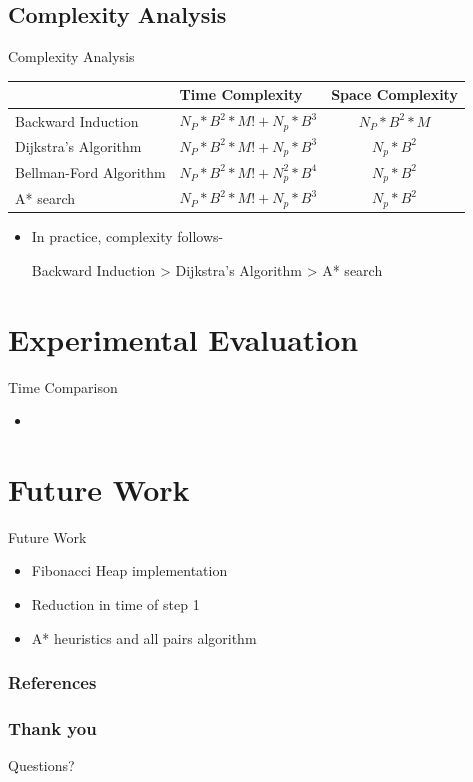 \documentclass{beamer}
\makeatletter
\newcounter{multipleslide}
\newcommand{\multipleframe}
{
	\setcounter{multipleslide}{\value{framenumber}}
	\stepcounter{multipleslide}
	\patchcmd{\beamer@@tmpl@footline}
	{\insertframenumber}
	{\themultipleslide}
	{}
	{}
}
\newcommand{\restoreframe}
{
	\patchcmd{\beamer@@tmpl@footline}
	{\themultipleslide}
  	{\insertframenumber}
	{}
	{}
	\setcounter{framenumber}{\value{multipleslide}}
}
\makeatother
\begin{document}
\subsection{Complexity Analysis}
\begin{frame}{Complexity Analysis}
\begin{table}
\begin{tabular}{|p{2.5cm}|p{4cm}|c|}
\hline
 & \textbf{Time Complexity} & \textbf{Space Complexity} \\
\hline
Backward Induction & $N_P*B^{2}*M! + N_p*B^3$ & $N_P*B^{2}*M$ \\
\hline
Dijkstra's Algorithm & $N_P*B^{2}*M! + N_p*B^3$ & $N_p*B^2$ \\
\hline
Bellman-Ford Algorithm & $N_P*B^{2}*M! + N_p^2*B^4$ & $N_p*B^2$ \\
\hline
A* search & $N_P*B^{2}*M! + N_p*B^3$ & $N_p*B^2$ \\
\hline
\end{tabular}
\end{table}
\begin{itemize}
\item In practice, complexity follows-
\begin{center}
Backward Induction > Dijkstra's Algorithm > A* search
\end{center}
\end{itemize}
\end{frame}

\section{Experimental Evaluation}
\begin{frame}{Time Comparison}
\begin{itemize}
\item 
\end{itemize}
\end{frame}

\section{Future Work}
\begin{frame}{Future Work}
\begin{itemize}
\item Fibonacci Heap implementation
\item Reduction in time of step 1
\item A* heuristics and all pairs algorithm
\end{itemize}
\end{frame}

\multipleframe
\begin{frame}[allowframebreaks]
\frametitle{References}
\nocite{coursera}
\nocite{cormen}
\nocite{ieee_mdp}


\end{frame}
\restoreframe

\begin{frame} \frametitle{Thank you}
\Huge{\centerline{\color{theme_color}Questions?}}
\end{frame}
\end{document}
